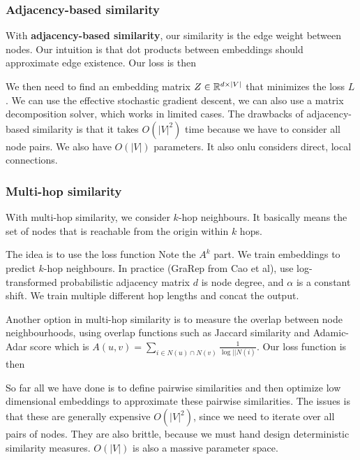 \subsubsection{Adjacency-based similarity}
    With \textbf{adjacency-based similarity}, our similarity is the edge weight between nodes. Our intuition is that dot products between embeddings should approximate edge existence. Our loss is then
    
    We then need to find an embedding matrix $Z \in \mathbb{R}^{d \times |V|}$ that minimizes the loss $L$. We can use the effective stochastic gradient descent, we can also use a matrix decomposition solver, which works in limited cases. 
    The drawbacks of adjacency-based similarity is that it takes $O(|V|^2)$ time because we have to consider all node pairs. We also have $O(|V|)$ parameters. It also onlu considers direct, local connections. 
    
\subsubsection{Multi-hop similarity}
    With multi-hop similarity, we consider $k$-hop neighbours. It basically means the set of nodes that is reachable from the origin within $k$ hops. 
    
    The idea is to use the loss function
    Note the $A^k$ part. We train embeddings to predict $k$-hop neighbours. In practice (GraRep from Cao et al), use log-transformed probabilistic adjacency matrix
    $d$ is node degree, and $\alpha$ is a constant shift. We train multiple different hop lengths and concat the output. 
    
    Another option in multi-hop similarity is to measure the overlap between node neighbourhoods, using overlap functions such as Jaccard similarity and Adamic-Adar score which is $A(u, v) = \sum_{i \in N(u) \cap N(v)} \frac{1}{\log||N(i)}$. Our loss function is then
    
    
    So far all we have done is to define pairwise similarities and then optimize low dimensional embeddings to approximate these pairwise similarities. The issues is that these are generally expensive $O(|V|^2)$, since we need to iterate over all pairs of nodes. They are also brittle, because we must hand design deterministic similarity measures. $O(|V|)$ is also a massive parameter space.
    
